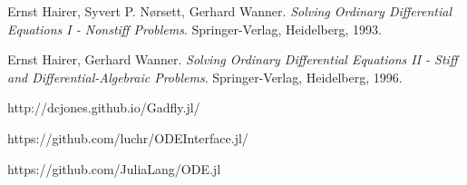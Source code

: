 \documentclass[notitlepage,12pt]{article}
\begin{document}




\begin{thebibliography}{9}
Ernst Hairer, Syvert P. N\o{}rsett, Gerhard Wanner. 
\textit{Solving Ordinary Differential Equations I - Nonstiff Problems}. 
Springer-Verlag, Heidelberg, 1993.

Ernst Hairer, Gerhard Wanner. 
\textit{Solving Ordinary Differential Equations II - Stiff and Differential-Algebraic Problems}. 
Springer-Verlag, Heidelberg, 1996.

http://dcjones.github.io/Gadfly.jl/

https://github.com/luchr/ODEInterface.jl/

https://github.com/JuliaLang/ODE.jl
\end{thebibliography}

\end{document}
